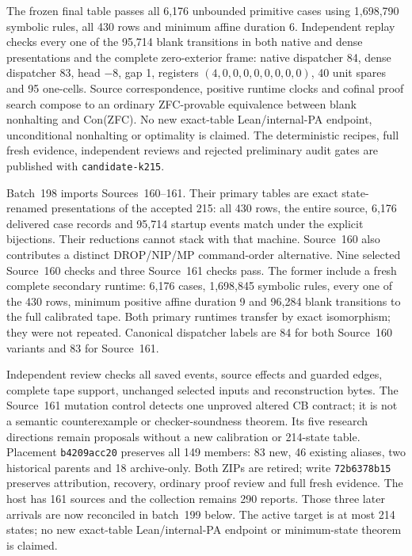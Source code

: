 \documentclass[11pt]{article}
\begin{document}
{The frozen final table passes all 6,176 unbounded primitive cases using
1,698,790 symbolic rules, all 430 rows and minimum affine duration 6.
Independent replay checks every one of the 95,714 blank transitions in both
native and dense presentations and the complete zero-exterior frame:
native dispatcher 84, dense dispatcher 83, head $-8$, gap 1, registers
$(4,0,0,0,0,0,0,0,0)$, 40 unit spares and 95 one-cells. Source correspondence,
positive runtime clocks and cofinal proof search compose to an ordinary
ZFC-provable equivalence between blank nonhalting and Con(ZFC). No new
exact-table Lean/internal-PA endpoint, unconditional nonhalting or optimality
is claimed. The deterministic recipes, full fresh evidence, independent
reviews and rejected preliminary audit gates are published with
\texttt{candidate-k215}.

Batch~198 imports Sources~160--161. Their primary tables are exact
state-renamed presentations of the accepted 215: all 430 rows, the entire
source, 6,176 delivered case records and 95,714 startup events match under
the explicit bijections. Their reductions cannot stack with that machine.
Source~160 also contributes a distinct DROP/NIP/MP command-order alternative.
Nine selected Source~160 checks and three Source~161 checks pass. The former
include a fresh complete secondary runtime: 6,176 cases, 1,698,845 symbolic
rules, every one of the 430 rows, minimum positive affine duration 9 and
96,284 blank transitions to the full calibrated tape. Both primary runtimes
transfer by exact isomorphism; they were not repeated. Canonical dispatcher
labels are 84 for both Source~160 variants and 83 for Source~161.

Independent review checks all saved events, source effects and guarded
edges, complete tape support, unchanged selected inputs and reconstruction
bytes. The Source~161 mutation control detects one unproved altered CB
contract; it is not a semantic counterexample or checker-soundness theorem.
Its five research directions remain proposals without a new calibration or
214-state table. Placement \texttt{b4209acc20} preserves all 149 members:
83 new, 46 existing aliases, two historical parents and 18 archive-only.
Both ZIPs are retired; write \texttt{72b6378b15} preserves attribution,
recovery, ordinary proof review and full fresh evidence. The host has 161
sources and the collection remains 290 reports. Those three later arrivals are now reconciled in batch~199 below. The active target is at most 214 states; no new exact-table
Lean/internal-PA endpoint or minimum-state theorem is claimed.

}
\end{document}
